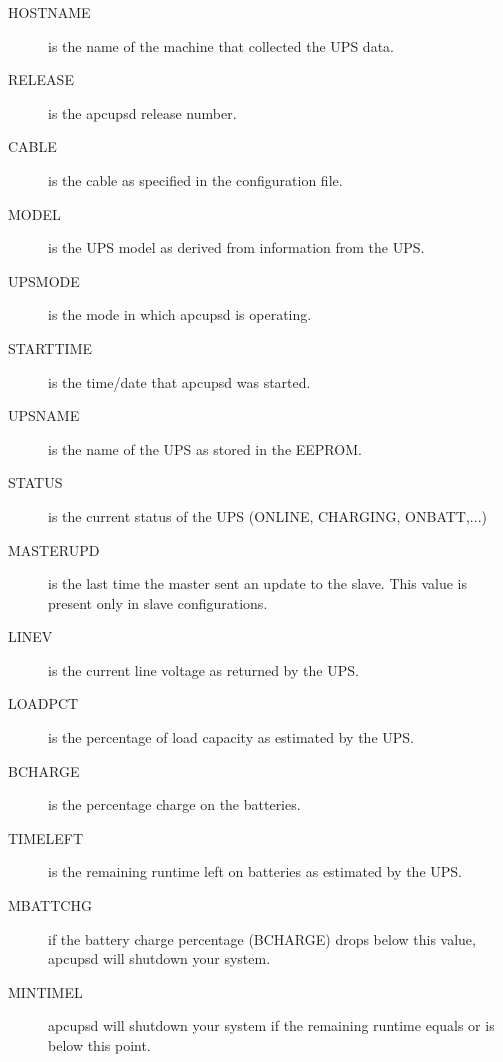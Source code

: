 {{{{{{{{{{{{{{{\begin{description}
\item [HOSTNAME]
   is the name of the machine that collected the UPS data.  

\item [RELEASE]
   is the apcupsd release number.  

\item [CABLE]
   is the cable as specified in the configuration file.  

\item [MODEL]
   is the UPS model as derived from information from the UPS.  

\item [UPSMODE]
   is the mode in which apcupsd is operating.  

\item [STARTTIME]
   is the time/date that apcupsd was started.  

\item [UPSNAME]
   is the name of the UPS as stored in the EEPROM.  

\item [STATUS]
   is the current status of the UPS (ONLINE, CHARGING, ONBATT,...)  

\item [MASTERUPD]
   is the last time the master sent an update to the slave. This value is present
only in slave configurations.  

\item [LINEV]
   is the current line voltage as returned by the UPS.  

\item [LOADPCT]
   is the percentage of load capacity as estimated by the UPS.  

\item [BCHARGE]
   is the percentage charge on the batteries.  

\item [TIMELEFT]
   is the remaining runtime left on batteries as estimated by the UPS.  

\item [MBATTCHG]
   if the battery charge percentage (BCHARGE) drops below this value, apcupsd
will shutdown your system.  

\item [MINTIMEL]
   apcupsd will shutdown your system if the remaining runtime equals or is below
this point.  


\end{description}}}}}}}}}}}}}}}}
